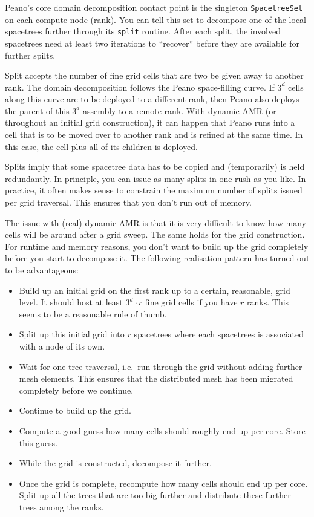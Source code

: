 Peano's core domain decomposition contact point is the singleton
\texttt{SpacetreeSet} on each compute node (rank).
You can tell this set to decompose one of the local spacetrees further through
its \texttt{split} routine.
After each split, the involved spacetrees need at least two iterations to
``recover'' before they are available for further spilts.


Split accepts the number of fine grid cells that are two be given away to
another rank.
The domain decomposition follows the Peano space-filling curve.
If $3^d$ cells along this curve are to be deployed to a different rank, then
Peano also deploys the parent of this $3^d$ assembly to a remote rank.
With dynamic AMR (or throughout an initial grid construction), it can happen
that Peano runs into a cell that is to be moved over to another rank and is
refined at the same time.
In this case, the cell plus all of its children is deployed.


\begin{remark}
 Splits imply that some spacetree data has to be copied and (temporarily) is
 held redundantly. In principle, you can issue as many splits in one rush as you
 like. In practice, it often makes sense to constrain the maximum number of
 splits issued per grid traversal. This ensures that you don't run out of
 memory.
\end{remark}



The issue with (real) dynamic AMR is that it is very difficult to know how many
cells will be around after a grid sweep.
The same holds for the grid construction.
For runtime and memory reasons, you don't want to build up the grid completely
before you start to decompose it.
The following realisation pattern has turned out to be advantageous:
\begin{itemize}
  \item Build up an initial grid on the first rank up to a certain, reasonable,
  grid level. It should host at least $3^d \cdot r$ fine grid cells if you have
  $r$ ranks. This seems to be a reasonable rule of thumb.
  \item Split up this initial grid into $r$ spacetrees where each spacetrees is
  associated with a node of its own.
  \item Wait for one tree traversal, i.e.~run through the grid without adding
  further mesh elements. This ensures that the distributed mesh has been
  migrated completely before we continue.
  \item Continue to build up the grid.
  \item Compute a good guess how many cells should roughly end up per core.
  Store this guess.
  \item While the grid is constructed, decompose it further.
  \item Once the grid is complete, recompute how many cells should end up per
  core. Split up all the trees that are too big further and distribute these
  further trees among the ranks.
\end{itemize}

 
